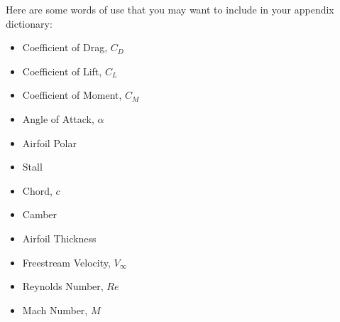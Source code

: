 \documentclass[12pt]{article}
\begin{document}
	\bigskip
	
	Here are some words of use that you may want to include in your appendix dictionary:
	
\begin{multicols}{2}
\begin{itemize}
    \item Coefficient of Drag, $C_D$
    \item Coefficient of Lift, $C_L$
    \item Coefficient of Moment, $C_M$
    \item Angle of Attack, $\alpha$
    \item Airfoil Polar
    \item Stall
    \item Chord, $c$
    \item Camber
    \item Airfoil Thickness
    \item Freestream Velocity, $V_\infty$
    \item Reynolds Number, $Re$
    \item Mach Number, $M$
\end{itemize}
\end{multicols}
	
	
\end{document}
